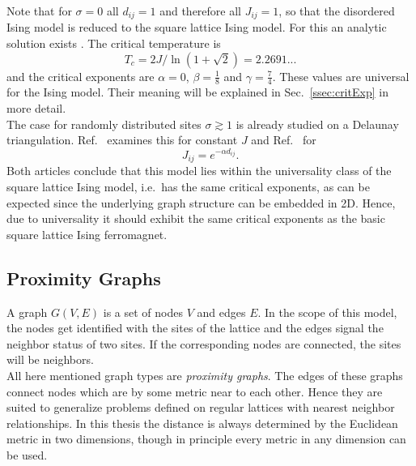     Note that for \(\sigma = 0\) all \(d_{ij} = 1\) and therefore all
    \(J_{ij} = 1\), so that the disordered Ising model is reduced to the
    square lattice Ising model. For this an analytic solution exists \cite{Onsager1944}.
    The critical temperature is
    \begin{equation}
        T_c = 2J/\ln(1+\sqrt 2) = 2.2691...
        \label{eq:exactTc}
    \end{equation}
    and the critical exponents are \(\alpha = 0\), \(\beta = \frac{1}{8}\)
    and \(\gamma = \frac{7}{4}\). These values are universal for the Ising
    model. Their meaning will be explained in Sec.\ \ref{ssec:critExp} in more detail.\\
    The case for randomly distributed sites \(\sigma \gtrsim 1\) is
    already studied on a Delaunay triangulation. Ref.\ \cite{Janke1994} examines
    this for constant \(J\) and Ref.\ \cite{Lima2000} for
    \begin{equation}
        J_{ij} = e^{-\alpha d_{ij}}.
        \label{eq:coupling}
    \end{equation}
    Both articles conclude that this model lies within the universality
    class of the square lattice Ising model, i.e.\ has the same critical
    exponents, as can be expected since the underlying graph structure can
    be embedded in 2D. Hence, due to universality it should exhibit the same
    critical exponents as the basic square lattice Ising ferromagnet.

\subsection{Proximity Graphs}
\label{ssec:graphtypes}
    A graph \(G(V,E)\) is a set of nodes \(V\) and edges \(E\). In the
    scope of this model, the nodes get identified with the sites of the
    lattice and the edges signal the neighbor status of two sites. If the
    corresponding nodes are connected, the sites will be neighbors.\\
    All here mentioned graph types are \emph{proximity graphs}.
    The edges of these graphs connect nodes which are by some metric near
    to each other.
    Hence they are suited to generalize problems defined on regular
    lattices with nearest neighbor relationships.
    In this thesis the distance is always determined by the Euclidean
    metric in two dimensions, though in principle every metric in any
    dimension can be used.\\

